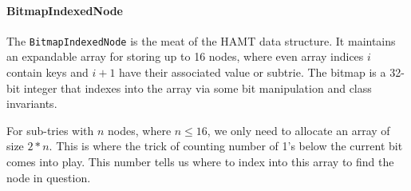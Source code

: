 \documentclass[preprint]{sigplanconf}
\begin{document}
\paragraph{BitmapIndexedNode}

The \texttt{BitmapIndexedNode}
is the meat of the HAMT data structure.
It maintains an expandable array for storing up to 
16 nodes, where even array indices $i$ contain
keys and $i+1$ have their associated value or
subtrie.
The bitmap is a 32-bit integer that indexes
into the array via some bit manipulation
and class invariants.


For sub-tries with $n$ nodes, where $n \le 16$, we only need to allocate
an array of size $2*n$.
This is where the trick of counting number of 1's below the current
bit comes into play.
This number tells us where to index into this array to find the node
in question.

\end{document}
